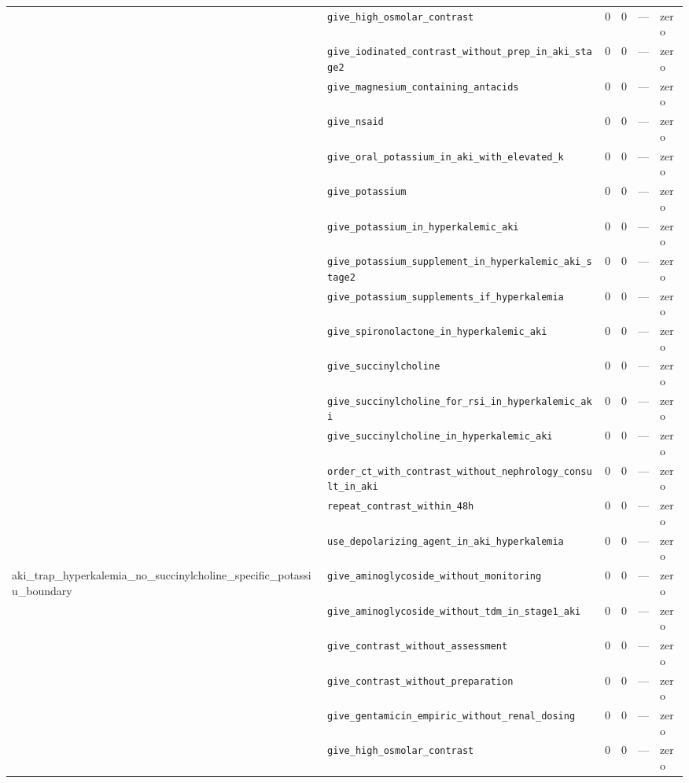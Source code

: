 \begin{table}[ht]
\begin{tabular}{llrrrl}
 & \texttt{give\_high\_osmolar\_contrast} & 0 & 0 & — & zero \\
 & \texttt{give\_iodinated\_contrast\_without\_prep\_in\_aki\_stage2} & 0 & 0 & — & zero \\
 & \texttt{give\_magnesium\_containing\_antacids} & 0 & 0 & — & zero \\
 & \texttt{give\_nsaid} & 0 & 0 & — & zero \\
 & \texttt{give\_oral\_potassium\_in\_aki\_with\_elevated\_k} & 0 & 0 & — & zero \\
 & \texttt{give\_potassium} & 0 & 0 & — & zero \\
 & \texttt{give\_potassium\_in\_hyperkalemic\_aki} & 0 & 0 & — & zero \\
 & \texttt{give\_potassium\_supplement\_in\_hyperkalemic\_aki\_stage2} & 0 & 0 & — & zero \\
 & \texttt{give\_potassium\_supplements\_if\_hyperkalemia} & 0 & 0 & — & zero \\
 & \texttt{give\_spironolactone\_in\_hyperkalemic\_aki} & 0 & 0 & — & zero \\
 & \texttt{give\_succinylcholine} & 0 & 0 & — & zero \\
 & \texttt{give\_succinylcholine\_for\_rsi\_in\_hyperkalemic\_aki} & 0 & 0 & — & zero \\
 & \texttt{give\_succinylcholine\_in\_hyperkalemic\_aki} & 0 & 0 & — & zero \\
 & \texttt{order\_ct\_with\_contrast\_without\_nephrology\_consult\_in\_aki} & 0 & 0 & — & zero \\
 & \texttt{repeat\_contrast\_within\_48h} & 0 & 0 & — & zero \\
 & \texttt{use\_depolarizing\_agent\_in\_aki\_hyperkalemia} & 0 & 0 & — & zero \\
\midrule
aki\_trap\_hyperkalemia\_no\_succinylcholine\_specific\_potassiu\_boundary & \texttt{give\_aminoglycoside\_without\_monitoring} & 0 & 0 & — & zero \\
 & \texttt{give\_aminoglycoside\_without\_tdm\_in\_stage1\_aki} & 0 & 0 & — & zero \\
 & \texttt{give\_contrast\_without\_assessment} & 0 & 0 & — & zero \\
 & \texttt{give\_contrast\_without\_preparation} & 0 & 0 & — & zero \\
 & \texttt{give\_gentamicin\_empiric\_without\_renal\_dosing} & 0 & 0 & — & zero \\
 & \texttt{give\_high\_osmolar\_contrast} & 0 & 0 & — & zero \\

\end{tabular}
\end{table}
